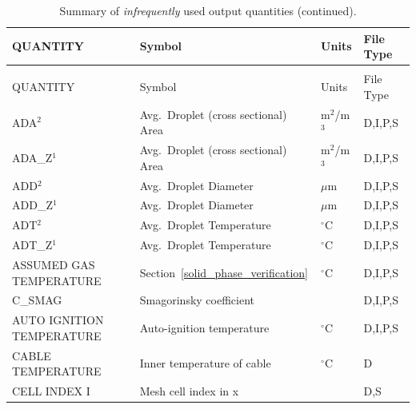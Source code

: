 \documentclass[11pt]{book}
\begin{document}
\begin{longtable}{@{\extracolsep{\fill}}|l|l|l|l|}
\caption[Infrequently used output quantities]{Summary of {\em infrequently} used output quantities.}
\label{tab:oddoutput} \\
\hline
{\ct QUANTITY}                           & Symbol                                        & Units          & File Type    \\
\hline \hline
\endfirsthead
\caption[]{Summary of {\em infrequently} used output quantities (continued).} \\
\hline
{\ct QUANTITY}                           & Symbol                                        & Units          & File Type    \\
\hline \hline
\endhead
{\ct ADA}$^2$                                   & Avg.~Droplet (cross sectional) Area               & m$^2$/m$^3$    & D,I,P,S      \\ \hline
{\ct ADA\_Z}$^1$                                & Avg.~Droplet (cross sectional) Area               & m$^2$/m$^3$    & D,I,P,S      \\ \hline
{\ct ADD}$^2$                                   & Avg.~Droplet Diameter                             & $\mu$m         & D,I,P,S      \\ \hline
{\ct ADD\_Z}$^1$                                & Avg.~Droplet Diameter                             & $\mu$m         & D,I,P,S      \\ \hline
{\ct ADT}$^2$                                   & Avg.~Droplet Temperature                          & $^\circ$C      & D,I,P,S      \\ \hline
{\ct ADT\_Z}$^1$                                & Avg.~Droplet Temperature                          & $^\circ$C      & D,I,P,S      \\ \hline
{\ct ASSUMED GAS TEMPERATURE}                   & Section~\ref{solid_phase_verification}            & $^\circ$C      & D,I,P,S      \\ \hline
{\ct C\_SMAG}                                   & Smagorinsky coefficient                           &                & D,I,P,S      \\ \hline
{\ct AUTO IGNITION TEMPERATURE}                 & Auto-ignition temperature                         & $^\circ$C      & D,I,P,S      \\ \hline
{\ct CABLE TEMPERATURE}                         & Inner temperature of cable                        & $^\circ$C      & D            \\ \hline
{\ct CELL INDEX I}                              & Mesh cell index in x                              &                & D,S          \\ \hline

\end{longtable}
\end{document}
